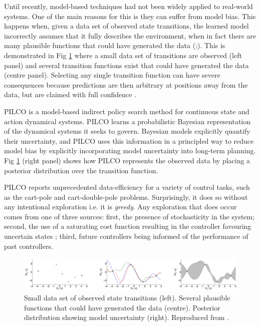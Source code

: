 Until recently, model-based techniques had not been widely applied to real-world systems. One of the main reasons for this is they can suffer from model bias. This happens when, given a data set of observed state transitions, the learned model incorrectly assumes that it fully describes the environment, when in fact there are many plausible functions that could have generated the data (\cite{atkeson1997comparison};\cite{schneider1997exploiting}). This is demonstrated in Fig \ref{Fig:model-bias} where a small data set of transitions are observed (left panel) and several transition functions exist that could have generated the data (centre panel). Selecting any single transition function can have severe consequences because predictions are then arbitrary at positions away from the data, but are claimed with full confidence \citep{deisenroth2011pilco}. 

PILCO \citep{deisenroth2011pilco} is a model-based indirect policy search method for continuous state and action dynamical systems. PILCO learns a probabilistic Bayesian representation of the dynamical systems it seeks to govern. Bayesian models explicitly quantify their uncertainty, and PILCO uses this information in a principled way to reduce model bias by explicitly incorporating model uncertainty into long-term planning. Fig \ref{Fig:model-bias} (right panel) shows how PILCO represents the observed data by placing a posterior distribution over the transition function. 

PILCO reports unprecedented data-efficiency for a variety of control tasks, such as the cart-pole and cart-double-pole problems. Surprisingly, it does so without any intentional exploration i.e. it is \textit{greedy}. Any exploration that does occur comes from one of three sources: first, the presence of stochasticity in the system; second, the use of a saturating cost function resulting in the controller favouring uncertain states \citep{deisenroth2013gaussian}; third, future controllers being informed of the performance of past controllers. 

\begin{figure}
\centering    
\includegraphics[width=1.0\textwidth]{Chapter1/Figures/PILCO-model-bias.png}
\caption[Model-based bias in reinforcement learning]{Small data set of observed state transitions (left). Several plausible functions that could have generated the data (centre). Posterior distribution showing model uncertainty (right). Reproduced from \citep{deisenroth2011pilco}.}
\label{Fig:model-bias}
\end{figure}


